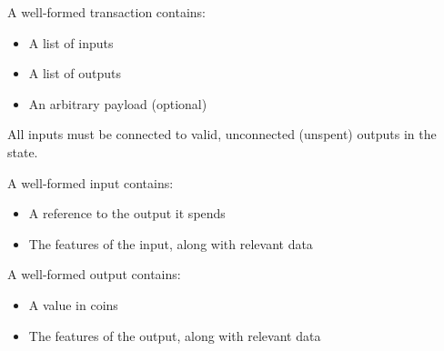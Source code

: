 A well-formed transaction contains:
\begin{itemize}
  \item A list of inputs
  \item A list of outputs
  \item An arbitrary payload (optional)
\end{itemize}
All inputs must be connected to valid, unconnected (unspent) outputs in the
state.

A well-formed input contains:
\begin{itemize}
  \item A reference to the output it spends
  \item The features of the input, along with relevant data
\end{itemize}

A well-formed output contains:
\begin{itemize}
  \item A value in coins
  \item The features of the output, along with relevant data
\end{itemize}

